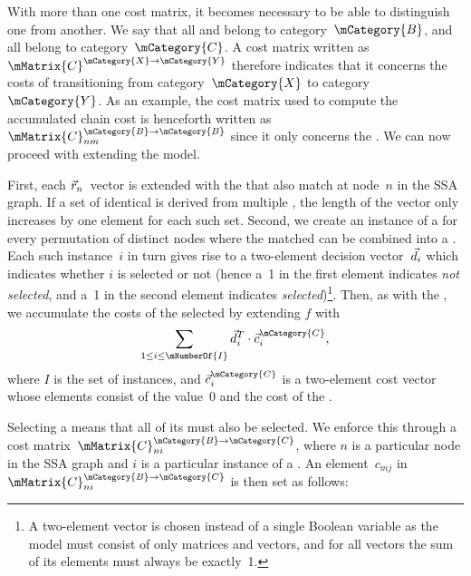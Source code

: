 With more than one cost matrix, it becomes necessary to be able to distinguish
one from another.
%
We say that all  and \tproxyRules belong
to category~$\mCategory{B}$, and all \tcomplexRules belong to
category~$\mCategory{C}$.
%
A cost matrix written as $\mMatrix{C}^{\mCategory{X}
  \rightarrow \mCategory{Y}}$ therefore indicates that it concerns the costs of
transitioning from category~$\mCategory{X}$ to category~$\mCategory{Y}$.
%
As an
example, the cost matrix used to compute the accumulated chain cost is
henceforth written as $\mMatrix{C}_{nm}^{\mCategory{B} \rightarrow
  \mCategory{B}}$ since it only concerns the \tbaseRules.
%
We can now proceed
with extending the  model.

First, each $\vec{r}_n$~vector is extended with the \tproxyRules that also
match at \gls{node}~$n$ in the \gls{SSA graph}.
%
If a set of identical
\tproxyRules is derived from multiple \tcomplexRules, the length of the vector
only increases by one element for each such set.
%
Second, we create an instance
of a \tcomplexRule for every permutation of distinct \glspl{node} where the
matched \tproxyRules can be combined into a \tcomplexRule.
%
Each such
instance~$i$ in turn gives rise to a \mbox{two-element} decision
vector~$\vec{d}_i$ which indicates whether $i$ is selected or not (hence a~1
in the first element indicates \emph{not selected}, and a~1 in the second
element indicates \emph{selected})\footnote{A \mbox{two-element} vector is
  chosen instead of a single Boolean variable as the 
  model must consist of only matrices and vectors, and for all vectors the sum
  of its elements must always be exactly~1.}.
%
Then, as with the \tbaseRules, we
accumulate the costs of the selected \tcomplexRules by extending $f$ with
\begin{displaymath}
  \sum_{1 \leq i \leq \mNumberOf{I}} \mVector{d}_i^T \cdot
  \mVector{c}_i^{\mCategory{C}},
\end{displaymath}
where $I$ is the set of \tcomplexRule instances, and
$\mVector{c}_i^{\mCategory{C}}$ is a \mbox{two-element} cost vector whose
elements consist of the value~0 and the cost of the \tcomplexRule.

Selecting a \tcomplexRule means that all of its \tproxyRules must also be
selected.
%
We enforce this through a cost matrix~$\mMatrix{C}_{ni}^{\mCategory{B}
  \rightarrow \mCategory{C}}$, where $n$ is a particular \gls{node} in the
\gls{SSA graph} and $i$ is a particular instance of a \tcomplexRule.
%
An
element~$c_{mj}$ in $\mMatrix{C}_{ni}^{\mCategory{B} \rightarrow \mCategory{C}}$
is then set as follows:

